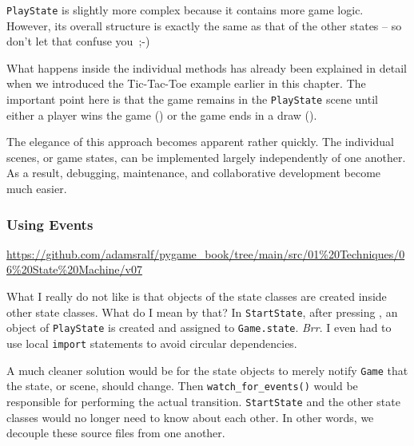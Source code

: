 
\texttt{PlayState} is slightly more complex because it contains more game logic. However, its overall structure is exactly the same as that of the other states -- so don't let that confuse you~{;-)}

What happens inside the individual methods has already been explained in detail when we introduced the Tic-Tac-Toe example earlier in this chapter. The important point here is that the game remains in the \texttt{PlayState} scene until either a player wins the game () or the game ends in a draw ().

\newpage
{}

The elegance of this approach becomes apparent rather quickly. The individual scenes, or game states, can be implemented largely independently of one another. As a result, debugging, maintenance, and collaborative development become much easier.

\subsubsection{Using Events}
\begin{diskbox}
	\url{https://github.com/adamsralf/pygame_book/tree/main/src/01%20Techniques/06%20State%20Machine/v07}
\end{diskbox}

What I really do not like is that objects of the state classes are created inside other state classes. What do I mean by that? In \texttt{StartState}, after pressing , an object of \texttt{PlayState} is created and assigned to \texttt{Game.state}. \emph{Brr}. I even had to use local \texttt{import} statements to avoid circular dependencies.

A much cleaner solution would be for the state objects to merely notify \texttt{Game} that the state, or scene, should change. Then \texttt{watch\_for\_events()} would be responsible for performing the actual transition. \texttt{StartState} and the other state classes would no longer need to know about each other. In other words, we decouple these source files from one another.

